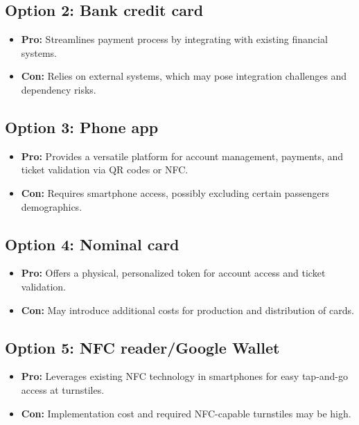 \subsection*{Option 2: Bank credit card}
\begin{itemize}
    \item \textbf{Pro:} Streamlines payment process by integrating with existing financial systems.
    \item \textbf{Con:} Relies on external systems, which may pose integration challenges and dependency risks.
\end{itemize}

\subsection*{Option 3: Phone app}
\begin{itemize}
    \item \textbf{Pro:} Provides a versatile platform for account management, payments, and ticket validation via QR codes or NFC.
    \item \textbf{Con:} Requires smartphone access, possibly excluding certain passengers demographics.
\end{itemize}

\subsection*{Option 4: Nominal card}
\begin{itemize}
    \item \textbf{Pro:} Offers a physical, personalized token for account access and ticket validation.
    \item \textbf{Con:} May introduce additional costs for production and distribution of cards.
\end{itemize}

\subsection*{Option 5: NFC reader/Google Wallet}
\begin{itemize}
    \item \textbf{Pro:} Leverages existing NFC technology in smartphones for easy tap-and-go access at turnstiles.
    \item \textbf{Con:} Implementation cost and required NFC-capable turnstiles may be high.
\end{itemize}


